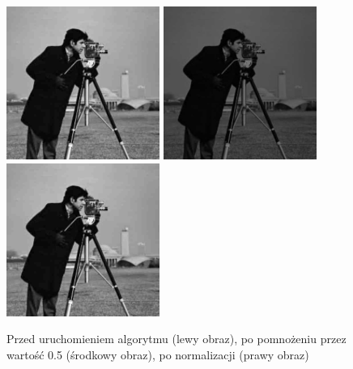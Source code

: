 \documentclass[a4paper,12pt]{book}
\begin{document}
\begin{figure}[H]
	\caption{Przed uruchomieniem algorytmu (lewy obraz), po pomnożeniu przez wartość 0.5 (środkowy obraz), po normalizacji (prawy obraz)}
	\includegraphics[width=5cm, height=5cm]{man-unmodified.jpg}
	\includegraphics[width=5cm, height=5cm]{2/multiply-gray-const.png}
	\includegraphics[width=5cm, height=5cm]{2/multiply-gray-const-norm.png}
\end{figure}
\end{document}
